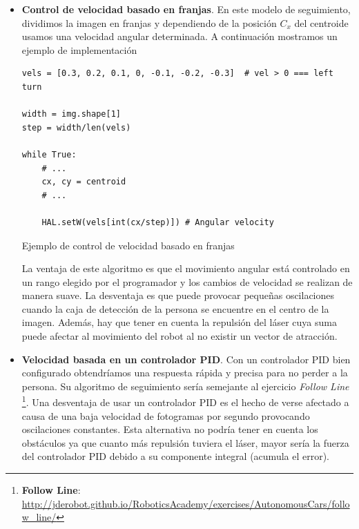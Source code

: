 \begin{itemize}
	\item \textbf{Control de velocidad basado en franjas}. En este modelo de seguimiento, dividimos la imagen en franjas y dependiendo de la posición $C_{x}$ del centroide usamos una velocidad angular determinada. A continuación mostramos un ejemplo de implementación
\begin{code}[H]
\begin{lstlisting}
vels = [0.3, 0.2, 0.1, 0, -0.1, -0.2, -0.3]	 # vel > 0 === left turn

width = img.shape[1]
step = width/len(vels)

while True:
	# ...
	cx, cy = centroid
	# ...
	
	HAL.setW(vels[int(cx/step)]) # Angular velocity
\end{lstlisting}
\caption{Ejemplo de control de velocidad basado en franjas}
\label{cod:vel_bar}
\end{code}
	La ventaja de este algoritmo es que el movimiento angular está controlado en un rango elegido por el programador y los cambios de velocidad se realizan de manera suave. La desventaja es que puede provocar pequeñas oscilaciones cuando la caja de detección de la persona se encuentre en el centro de la imagen. Además, hay que tener en cuenta la repulsión del láser cuya suma puede afectar al movimiento del robot al no existir un vector de atracción.
	
	\item \textbf{Velocidad basada en un controlador PID}. Con un controlador PID bien configurado obtendríamos una respuesta rápida y precisa para no perder a la persona. Su algoritmo de seguimiento sería semejante al ejercicio \textit{Follow Line} \footnote{\textbf{Follow Line}: \url{http://jderobot.github.io/RoboticsAcademy/exercises/AutonomousCars/follow_line/}}. Una desventaja de usar un controlador PID es el hecho de verse afectado a causa de una baja velocidad de fotogramas por segundo provocando oscilaciones constantes. Esta alternativa no podría tener en cuenta los obstáculos ya que cuanto más repulsión tuviera el láser, mayor sería la fuerza del controlador PID debido a su componente integral (acumula el error).
	

\end{itemize}
